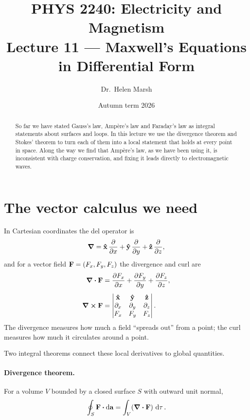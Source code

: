 \documentclass[11pt,a4paper]{article}
\title{PHYS 2240: Electricity and Magnetism\\[4pt]
  \large Lecture 11 --- Maxwell's Equations in Differential Form}
\author{Dr.\ Helen Marsh}
\date{Autumn term 2026}
\theoremstyle{definition}
\theoremstyle{remark}
\begin{document}
\maketitle

\begin{abstract}
\noindent So far we have stated Gauss's law, Ampère's law and Faraday's law as integral statements about surfaces and loops. In this lecture we use the divergence theorem and Stokes' theorem to turn each of them into a local statement that holds at every point in space. Along the way we find that Ampère's law, as we have been using it, is inconsistent with charge conservation, and fixing it leads directly to electromagnetic waves.
\end{abstract}

\tableofcontents

\section{The vector calculus we need}
\label{sec:vector-calculus}

In Cartesian coordinates the del operator is
\[
  \grad = \vu{x}\,\pdv{x} + \vu{y}\,\pdv{y} + \vu{z}\,\pdv{z},
\]
and for a vector field $\vb{F} = (F_x, F_y, F_z)$ the divergence and curl are
\begin{align}
  \div{\vb{F}} &= \pdv{F_x}{x} + \pdv{F_y}{y} + \pdv{F_z}{z}, \label{eq:div-cart}\\[4pt]
  \curl{\vb{F}} &=
  \begin{vmatrix}
    \vu{x} & \vu{y} & \vu{z} \\
    \partial_x & \partial_y & \partial_z \\
    F_x & F_y & F_z
  \end{vmatrix}. \label{eq:curl-cart}
\end{align}
The divergence measures how much a field ``spreads out'' from a point; the curl measures how much it circulates around a point.

Two integral theorems connect these local derivatives to global quantities.

\paragraph{Divergence theorem.} For a volume $V$ bounded by a closed surface $S$ with outward unit normal,
\begin{equation}\label{eq:divergence-theorem}
  \oint_S \vb{F}\vdot\dd{\vb{a}} = \int_V (\div{\vb{F}})\,\dd{\tau}.
\end{equation}
\end{document}
